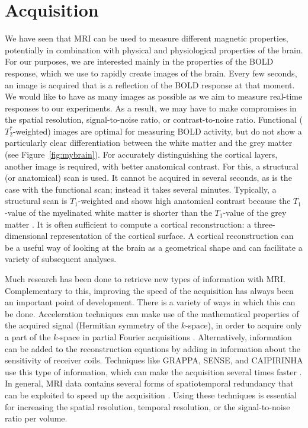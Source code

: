 \section*{Acquisition}
We have seen that MRI can be used to measure different magnetic properties, potentially in combination with physical and physiological properties of the brain. For our purposes, we are interested mainly in the properties of the BOLD response, which we use to rapidly create images of the brain. Every few seconds, an image is acquired that is a reflection of the BOLD response at that moment. We would like to have as many images as possible as we aim to measure real-time responses to our experiments. As a result, we may have to make compromises in the spatial resolution, signal-to-noise ratio, or contrast-to-noise ratio. Functional ($T_2^*$-weighted) images are optimal for measuring BOLD activity, but do not show a particularly clear differentiation between the white matter and the grey matter (see Figure~\ref{fig:mybrain}). For accurately distinguishing the cortical layers, another image is required, with better anatomical contrast. For this, a structural (or anatomical) scan is used. It cannot be acquired in several seconds, as is the case with the functional scan; instead it takes several minutes. Typically, a structural scan is $T_1$-weighted and shows high anatomical contrast because the $T_1$-value of the myelinated white matter is shorter than the $T_1$-value of the grey matter \cite{Wansapura1999}. It is often sufficient to compute a cortical reconstruction: a three-dimensional representation of the cortical surface. A cortical reconstruction can be a useful way of looking at the brain as a geometrical shape and can facilitate a variety of subsequent analyses.


Much research has been done to retrieve new types of information with MRI. Complementary to this, improving the speed of the acquisition has always been an important point of development. There is a variety of ways in which this can be done. Acceleration techniques can make use of the mathematical properties of the acquired signal (Hermitian symmetry of the $k$-space), in order to acquire only a part of the $k$-space in partial Fourier acquisitions \cite{Feinberg1986}. Alternatively, information can be added to the reconstruction equations by adding in information about the sensitivity of receiver coils. Techniques like GRAPPA, SENSE, and CAIPIRINHA use this type of information, which can make the acquisition several times faster \cite{Setsompop2016}. In general, MRI data contains several forms of spatiotemporal redundancy that can be exploited to speed up the acquisition \cite{Tsao2012}. Using these techniques is essential for increasing the spatial resolution, temporal resolution, or the signal-to-noise ratio per volume.

